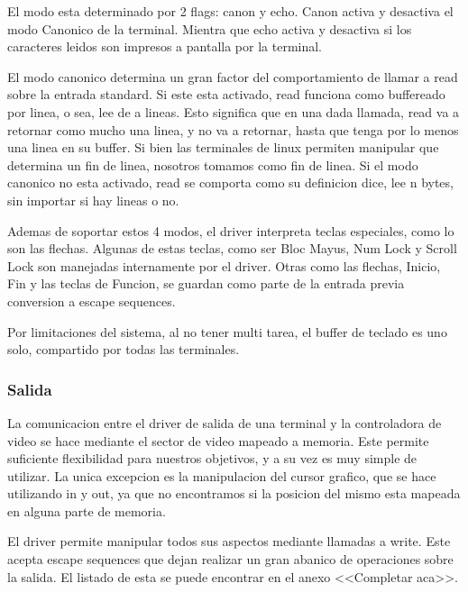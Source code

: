 \documentclass[a4paper,10pt]{article}
\begin{document}
            El modo esta determinado por 2 flags: canon y echo.
            Canon activa y desactiva el modo Canonico de la terminal.
            Mientra que echo activa y desactiva si los caracteres leidos son impresos a pantalla por la terminal.

            El modo canonico determina un gran factor del comportamiento de llamar a read sobre la entrada standard.
            Si este esta activado, read funciona como buffereado por linea, o sea, lee de a lineas.
            Esto significa que en una dada llamada, read va a retornar como mucho una linea, y no va a retornar, hasta que tenga por lo menos una linea en su buffer.
            Si bien las terminales de linux permiten manipular que determina un fin de linea, nosotros tomamos \n como fin de linea.
            Si el modo canonico no esta activado, read se comporta como su definicion dice, lee n bytes, sin importar si hay lineas o no.

            Ademas de soportar estos 4 modos, el driver interpreta teclas especiales, como lo son las flechas.
            Algunas de estas teclas, como ser Bloc Mayus, Num Lock y Scroll Lock son manejadas internamente por el driver.
            Otras como las flechas, Inicio, Fin y las teclas de Funcion, se guardan como parte de la entrada previa conversion a escape sequences.

            Por limitaciones del sistema, al no tener multi tarea, el buffer de teclado es uno solo, compartido por todas las terminales.

        \subsubsection{Salida}
            La comunicacion entre el driver de salida de una terminal y la controladora de video se hace mediante el sector de video mapeado a memoria.
            Este permite suficiente flexibilidad para nuestros objetivos, y a su vez es muy simple de utilizar.
            La unica excepcion es la manipulacion del cursor grafico, que se hace utilizando in y out, ya que no encontramos si la posicion del mismo esta mapeada en alguna parte de memoria.

            El driver permite manipular todos sus aspectos mediante llamadas a write.
            Este acepta escape sequences que dejan realizar un gran abanico de operaciones sobre la salida.
            El listado de esta se puede encontrar en el anexo <<Completar aca>>.
            
\end{document}
